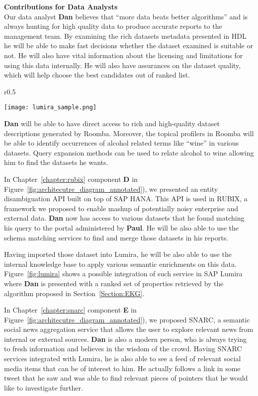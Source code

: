 \textbf{Contributions for Data Analysts}
\vspace{1mm}\\

Our data analyst \textbf{Dan} believes that ``more data beats better algorithms'' and is always hunting for high quality data to produce accurate reports to the management team. By examining the rich datasets metadata presented in HDL he will be able to make fast decisions whether the dataset examined is suitable or not. He will also have vital information about the licensing and limitations for using this data internally. He will also have assurances on the dataset quality, which will help choose the best candidates out of ranked list.

\begin{wrapfigure}{r}{0.5\textwidth}
  \begin{center}
    \texttt{[image: lumira\_sample.png]}
  \end{center}
  \caption{UI Prototype of semantic data enrichment in SAP Lumira}
  \label{fig:lumira}
\end{wrapfigure}

\textbf{Dan} will be able to have direct access to rich and high-quality dataset descriptions generated by Roomba. Moreover, the topical profilers in Roomba will be able to identify occurrences of alcohol related terms like ``wine'' in various datasets. Query expansion methods can be used to relate alcohol to wine allowing him to find the datasets he wants.

In Chapter~\ref{chapter:rubix} component \textbf{D} in Figure~\ref{fig:architecutre_diagram_annotated}), we presented an entity disambiguation API built on top of SAP HANA. This API is used in RUBIX, a framework we proposed to enable mashup of potentially noisy enterprise and external data.
\textbf{Dan} now has access to various datasets that he found matching his query to the portal administered by \textbf{Paul}. He will be also able to use the schema matching services to find and merge those datasets in his reports.

Having imported those dataset into Lumira, he will be also able to use the internal knowledge base to apply various semantic enrichments on this data. Figure~\ref{fig:lumira} shows a possible integration of such service in SAP Lumira where \textbf{Dan} is presented with a ranked set of properties retrieved by the algorithm proposed in Section~\ref{Section:EKG}.

In Chapter~\ref{chapter:snarc} component \textbf{E} in Figure~\ref{fig:architecutre_diagram_annotated}), we proposed SNARC, a semantic social news aggregation service that allows the user to explore relevant news from internal or external sources. \textbf{Dan} is also a modern person, who is always trying to fresh information and believes in the wisdom of the crowd. Having SNARC services integrated with Lumira, he is also able to see a feed of relevant social media items that can be of interest to him. He actually follows a link in some tweet that he saw and was able to find relevant pieces of pointers that he would like to investigate further.

